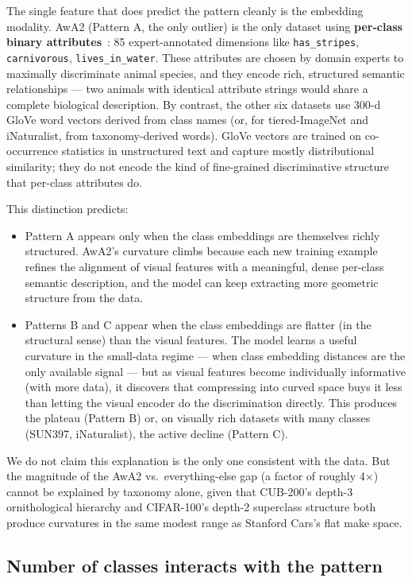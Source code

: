 \documentclass{article}
\begin{document}
The single feature that does predict the pattern cleanly is the embedding modality.
AwA2 (Pattern A, the only outlier) is the only dataset using \textbf{per-class binary attributes}~\cite{xian2018awa2}: 85 expert-annotated dimensions like \texttt{has\_stripes}, \texttt{carnivorous}, \texttt{lives\_in\_water}.
These attributes are chosen by domain experts to maximally discriminate animal species, and they encode rich, structured semantic relationships --- two animals with identical attribute strings would share a complete biological description.
By contrast, the other six datasets use 300-d GloVe word vectors derived from class names (or, for tiered-ImageNet and iNaturalist, from taxonomy-derived words).
GloVe vectors are trained on co-occurrence statistics in unstructured text and capture mostly distributional similarity; they do not encode the kind of fine-grained discriminative structure that per-class attributes do.

This distinction predicts:
\begin{itemize}
    \item Pattern A appears only when the class embeddings are themselves richly structured. AwA2's curvature climbs because each new training example refines the alignment of visual features with a meaningful, dense per-class semantic description, and the model can keep extracting more geometric structure from the data.
    \item Patterns B and C appear when the class embeddings are flatter (in the structural sense) than the visual features. The model learns a useful curvature in the small-data regime --- when class embedding distances are the only available signal --- but as visual features become individually informative (with more data), it discovers that compressing into curved space buys it less than letting the visual encoder do the discrimination directly. This produces the plateau (Pattern B) or, on visually rich datasets with many classes (SUN397, iNaturalist), the active decline (Pattern C).
\end{itemize}
We do not claim this explanation is the only one consistent with the data.
But the magnitude of the AwA2 vs.\ everything-else gap (a factor of roughly 4$\times$) cannot be explained by taxonomy alone, given that CUB-200's depth-3 ornithological hierarchy and CIFAR-100's depth-2 superclass structure both produce curvatures in the same modest range as Stanford Cars's flat make space.

\subsection{Number of classes interacts with the pattern}\label{sec:n_classes_effect}
\end{document}
